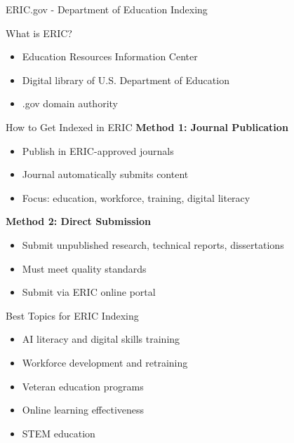 \documentclass[11pt]{beamer}
\begin{document}
		\begin{frame}{ERIC.gov - Department of Education Indexing}
			\scriptsize
			\begin{block}{What is ERIC?}
				\begin{itemize}
					\item Education Resources Information Center
					\item Digital library of U.S. Department of Education
					\item .gov domain authority
				\end{itemize}
			\end{block}
			\begin{block}{How to Get Indexed in ERIC}
				\textbf{Method 1: Journal Publication}
				\begin{itemize}
					\item Publish in ERIC-approved journals
					\item Journal automatically submits content
					\item Focus: education, workforce, training, digital literacy
				\end{itemize}
				\textbf{Method 2: Direct Submission}
				\begin{itemize}
					\item Submit unpublished research, technical reports, dissertations
					\item Must meet quality standards
					\item Submit via ERIC online portal
				\end{itemize}
			\end{block}
			\begin{block}{Best Topics for ERIC Indexing}
				\begin{itemize}
					\item AI literacy and digital skills training
					\item Workforce development and retraining
					\item Veteran education programs
					\item Online learning effectiveness
					\item STEM education
				\end{itemize}
			\end{block}
		\end{frame}
		
\end{document}
